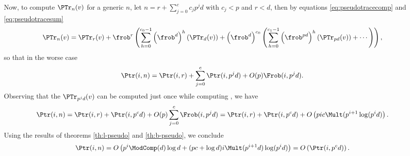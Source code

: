 Now, to compute $\PTr_n(v)$ for a generic $n$, let $n = r +
\sum_{j=0}^{c}c_jp^jd$ with $c_j<p$ and $r<d$, then by equations
\eqref{eq:pseudotracecomp} and \eqref{eq:pseudotracesum}
\begin{equation*}
  \PTr_n(v) =
  \PTr_r(v) + \frob^r\left(
  \sum_{h=0}^{c_0-1}\left(\frob^{d}\right)^h(\PTr_d(v)) + \left(\frob^d\right)^{c_0}\left(
  \sum_{h=0}^{c_1-1}\left(\frob^{pd}\right)^h(\PTr_{pd}(v)) + \cdots
  \right)
  \right),
\end{equation*}
so that in the worse case
\begin{equation*}
  \Ptr(i,n) = \Ptr(i,r) + \sum_{j=0}^c \Ptr(i,p^jd) + O(p)\Frob(i,p^jd)
  .
\end{equation*}
Observing that the $\PTr_{p^jd}(v)$ can be computed just once while
computing , we have
\begin{multline*}
  \Ptr(i,n) = \Ptr(i,r) + \Ptr(i,p^cd) + O(p)\sum_{j=0}^c \Frob(i,p^jd) =
  \Ptr(i,r) + \Ptr(i,p^cd) + O\left(pic\Mult(p^{i+1}\log(p^id)\right)
  .
\end{multline*}
Using the results of theorems \ref{th:l-pseudo} and \ref{th:b-pseudo},
we conclude
\begin{equation*}
  \Ptr(i,n) = O\left(p^i\ModComp(d)\log d +
  (pc +\log d)i\Mult(p^{i+1}d)\log(p^id)\right) =
  O\left( \Ptr(i, p^cd) \right) .
\end{equation*}

